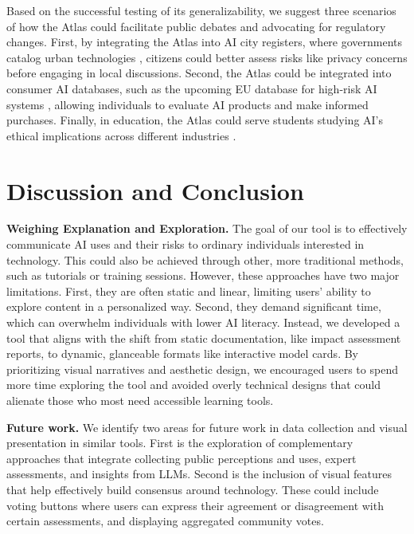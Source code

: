 Based on the successful testing of its generalizability, we suggest three scenarios of how the Atlas could facilitate public debates and advocating for regulatory changes. First, by integrating the Atlas into AI city registers, where governments catalog urban technologies \cite{cityRegister}, citizens could better assess risks like privacy concerns before engaging in local discussions. Second, the Atlas could be integrated into consumer AI databases, such as the upcoming EU database for high-risk AI systems \cite{EUACT2024}, allowing individuals to evaluate AI products and make informed purchases. Finally, in education, the Atlas could serve students studying AI's ethical implications across different industries \cite{feffer2023ai}.

\section{Discussion and Conclusion}
\label{sec:discussion}

\noindent\textbf{Weighing Explanation and Exploration.} The goal of our tool is to effectively communicate AI uses and their risks to ordinary individuals interested in technology. This could also be achieved through other, more traditional methods, such as tutorials or training sessions. However, these approaches have two major limitations. First, they are often static and linear, limiting users' ability to explore content in a personalized way. Second, they demand significant time, which can overwhelm individuals with lower AI literacy. Instead, we developed a tool that aligns with the shift from static documentation, like impact assessment reports, to dynamic, glanceable formats like interactive model cards. By prioritizing visual narratives and aesthetic design, we encouraged users to spend more time exploring the tool and avoided overly technical designs that could alienate those who most need accessible learning tools.

\vspace{1pt}

\noindent\textbf{Future work.} We identify two areas for future work in data collection and visual presentation in similar tools. First is the exploration of complementary approaches that integrate collecting public perceptions and uses, expert assessments, and insights from LLMs. Second is the inclusion of visual features that help effectively build consensus around technology. These could include voting buttons where users can express their agreement or disagreement with certain assessments, and displaying aggregated community votes.

